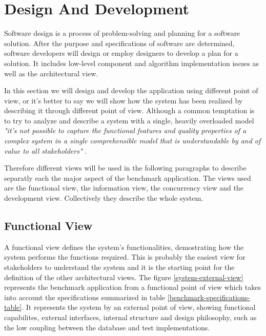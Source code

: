 		
		
	
	\section{Design And Development}
Software design is a process of problem-solving and planning for a software solution. After the purpose and specifications of software are determined, software developers will design or employ designers to develop a plan for a solution. It includes low-level component and algorithm implementation issues as well as the architectural view.

In this section we will design and develop the application using different point of view, or it's better to say we will show how the system has been realized by describing it through different point of view. Although a common temptation is to try to analyze and describe a system with a single, heavily overloaded model \emph{"it's not possible to capture the functional features and quality properties of a complex system in a single comprehensible model that is understandable by and of value to all stakeholders"} \cite{SSA}.

Therefore different views will be used in the following paragraphs to describe separatly each the major aspect of the benchmark application. The views used are the functional view, the information view, the concurrency view and the development view. Collectively they describe the whole system. 

		\subsection{Functional View}
A functional view defines the system's functionalities, demostrating how the system performs the functions required. This is probably the easiest view for stakeholders to understand the system and it is the starting point for the definition of the other architectural views. The figure \ref{system-external-view} represents the benchmark application from a functional point of view which takes into account the specifications summarized in table \ref{benchmark-specifications-table}. It represents the system by an external point of view, showing functional capabilites, external interfaces, internal structure and design philosophy, such as the low coupling between the database and test implementations.
		
